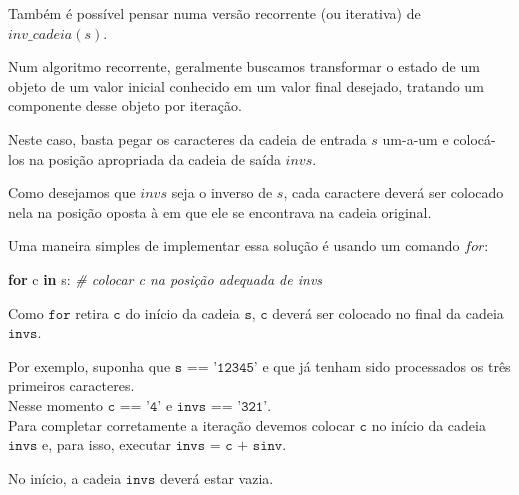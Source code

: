 \documentclass[11pt,a4paper]{article}
\newenvironment{Shaded}{}{}
\newcommand{\KeywordTok}[1]{\textcolor[rgb]{0.00,0.44,0.13}{\textbf{{#1}}}}
\newcommand{\CommentTok}[1]{\textcolor[rgb]{0.38,0.63,0.69}{\textit{{#1}}}}
\newcommand{\NormalTok}[1]{{#1}}
\newcommand{\ControlFlowTok}[1]{\textcolor[rgb]{0.00,0.44,0.13}{\textbf{{#1}}}}
\begin{document}
    Também é possível pensar numa versão recorrente (ou iterativa) de
\(\mathit{inv\_cadeia}(s)\).

Num algoritmo recorrente, geralmente buscamos transformar o estado de um
objeto de um valor inicial conhecido em um valor final desejado,
tratando um componente desse objeto por iteração.

    Neste caso, basta pegar os caracteres da cadeia de entrada \(s\) um-a-um
e colocá-los na posição apropriada da cadeia de saída \(invs\).

Como desejamos que \(invs\) seja o inverso de \(s\), cada caractere
deverá ser colocado nela na posição oposta à em que ele se encontrava na
cadeia original.

Uma maneira simples de implementar essa solução é usando um comando
\(\mathit{for}\):

\begin{Shaded}
\begin{Highlighting}[]
\ControlFlowTok{for}\NormalTok{ c }\KeywordTok{in}\NormalTok{ s:}
    \CommentTok{# colocar c na posição adequada de invs}
\end{Highlighting}
\end{Shaded}

Como \(\texttt{for}\) retira \(\texttt{c}\) do início da cadeia
\(\texttt{s}\), \(\texttt{c}\) deverá ser colocado no final da cadeia
\(\texttt{invs}\).

Por exemplo, suponha que \(\texttt{s == '12345'}\) e que já tenham sido
processados os três primeiros caracteres.\\
Nesse momento \(\texttt{c == '4'}\) e \(\texttt{invs == '321'}\).\\
Para completar corretamente a iteração devemos colocar \(\texttt{c}\) no
início da cadeia \(\texttt{invs}\) e, para isso, executar
\(\texttt{invs = c + sinv}\).

No início, a cadeia \(\texttt{invs}\) deverá estar vazia.
\end{document}
